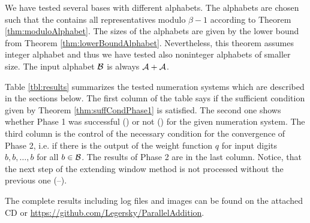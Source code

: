 We have tested several bases with different alphabets. The alphabets are chosen such that the contains all representatives modulo $\beta-1$ according to Theorem \ref{thm:moduloAlphabet}. The sizes of the alphabets are given by the lower bound from Theorem \ref{thm:lowerBoundAlphabet}. Nevertheless, this theorem assumes integer alphabet and thus we have tested also noninteger alphabets of smaller size. The input alphabet $\mathcal{B}$ is always $\mathcal{A}+ \mathcal{A}$.  

 Table \ref{tbl:results} summarizes the tested numeration systems which are described in the sections below. The first column of the table says if the sufficient condition given by Theorem \ref{thm:suffCondPhase1} is satisfied. The second one shows whether Phase 1 was successful (\checkmark) or not (\xmark) for the given numeration system. The third column is the control of the necessary condition for the convergence of Phase 2, i.e. if there is the output of the weight function $q$ for input digits $b,b,\dots,b$ for all $b\in\mathcal{B}$. The results of Phase 2 are in the last column. Notice, that the next step of the extending window method is not processed without the previous one (--).

The complete results including log files and images can be found on the attached CD  or \url{https://github.com/Legersky/ParallelAddition}.

